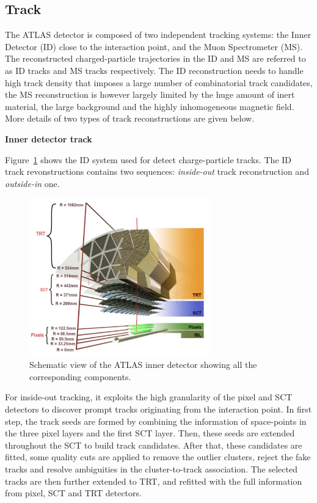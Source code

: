 \subsection{Track}
\label{sec:track}

The ATLAS detector is composed of two independent tracking systems: the Inner Detector (ID) close to the interaction point, and the Muon Spectrometer (MS).
The reconstructed charged-particle trajectories in the ID and MS are referred to as ID tracks and MS tracks respectively.
The ID reconstruction needs to handle high track density that imposes a large number of combinatorial track candidates, 
the MS reconstruction is however largely limited by the huge amount of inert material, the large background and the highly inhomogeneous magnetic field\cite{Cornelissen:1020106}.
More details of two types of track reconstructions are given below.

\textbf{Inner detector track}

Figure~\ref{fig:track_ID} shows the ID system used for detect charge-particle tracks.
The ID track revonstructions contains two sequences: \textit{inside-out} track reconstruction and \textit{outside-in} one.
\begin{figure}[!htb]
  \centering
  \includegraphics[width=0.7\textwidth]{figures/Simulation/track_ID.png}
  \caption{Schematic view of the ATLAS inner detector showing all the corresponding components.}
  \label{fig:track_ID}
\end{figure}

For inside-out tracking, it exploits the high granularity of the pixel and SCT detectors to discover prompt tracks originating from the interaction point.
In first step, the track seeds are formed by combining the information of space-points in the three pixel layers and the first SCT layer.
Then, these seeds are extended throughout the SCT to build track candidates.
After that, these candidates are fitted, some quality cuts are applied to remove the outlier clusters, reject the fake tracks and resolve ambiguities in the cluster-to-track association.
The selected tracks are then further extended to TRT, and refitted with the full information from pixel, SCT and TRT detectors.

